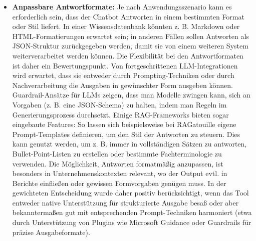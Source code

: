 \begin{itemize}
    \item \textbf{Anpassbare Antwortformate:} Je nach Anwendungsszenario kann es erforderlich sein, dass der Chatbot Antworten in einem bestimmten Format oder Stil liefert. In einer Wissensdatenbank könnten z. B. Markdown oder HTML-Formatierungen erwartet sein; in anderen Fällen sollen Antworten als JSON-Struktur zurückgegeben werden, damit sie von einem weiteren System weiterverarbeitet werden können. Die Flexibilität bei den Antwortformaten ist daher ein Bewertungspunkt. Von fortgeschrittenen LLM-Integrationen wird erwartet, dass sie entweder durch Prompting-Techniken oder durch Nachverarbeitung die Ausgaben in gewünschter Form ausgeben können. Guardrail-Ansätze für LLMs zeigen, dass man Modelle zwingen kann, sich an Vorgaben (z. B. eine JSON-Schema) zu halten, indem man Regeln im Generierungsprozess durchsetzt. Einige RAG-Frameworks bieten sogar eingebaute Features: So lassen sich beispielsweise bei RAGatouille eigene Prompt-Templates definieren, um den Stil der Antworten zu steuern. Dies kann genutzt werden, um z. B. immer in vollständigen Sätzen zu antworten, Bullet-Point-Listen zu erstellen oder bestimmte Fachterminologie zu verwenden. Die Möglichkeit, Antworten formatmäßig anzupassen, ist besonders in Unternehmenskontexten relevant, wo der Output evtl. in Berichte einfließen oder gewissen Formvorgaben genügen muss. In der gewichteten Entscheidung wurde daher positiv berücksichtigt, wenn das Tool entweder native Unterstützung für strukturierte Ausgabe besaß oder aber bekanntermaßen gut mit entsprechenden Prompt-Techniken harmoniert (etwa durch Unterstützung von Plugins wie Microsoft Guidance oder Guardrails für präzise Ausgabeformate).

\end{itemize}
